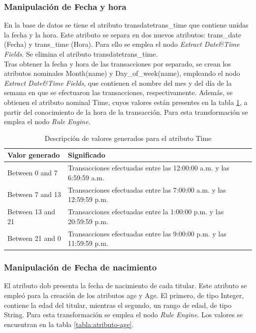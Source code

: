 \subsubsection{Manipulación de Fecha y hora}
En la base de datos se tiene el atributo \textsf{transdatetrans\_time} que contiene unidas la fecha y la hora. Este atributo se separa en dos nuevos atributos: \textsf{trans\_date} (Fecha) y \textsf{trans\_time} (Hora). Para ello se emplea el nodo \textit{Extract Date\&Time Fields}. Se elimina el atributo \textsf{transdatetrans\_time}. \\
Tras obtener la fecha y hora de las transacciones por separado, se crean los atributos nominales \textsf{Month(name)} y \textsf{Day\_of\_week(name)}, empleando el nodo \textit{Extract Date\&Time Fields}, que contienen el nombre del mes y del día de la semana en que se efectuaron las transacciones, respectivamente.
 Además, se obtienen el atributo nominal \textsf{Time}, cuyos valores están presentes en la tabla \ref{tabla:atributo-time}, a partir del conocimiento de la hora de la transacción. Para esta transformación se emplea el nodo \textit{Rule Engine}.

\begin{table} [H]
	\centering
	\begin{tabular}{p{5cm} p{7cm}}
		\toprule
		\textbf{Valor generado} & \textbf{Significado} \\
		\midrule
		Between 0 and 7 & Transacciones efectuadas entre las 12:00:00 a.m. y las 6:59:59 a.m. \\
		\addlinespace
		Between 7 and 13 & Transacciones efectuadas entre las 7:00:00 a.m. y las 12:59:59 p.m. \\
		\addlinespace
		Between 13 and 21 & Transacciones efectuadas entre la 1:00:00 p.m. y las 20:59:59 p.m. \\
		Between 21 and 0 & Transacciones efectuadas entre las 9:00:00 p.m. y las 11:59:59 p.m. \\
		\bottomrule
	\end{tabular}
	\caption{Descripción de valores generados para el atributo \textsf{Time}}
	\label{tabla:atributo-time}
\end{table}

\subsubsection{Manipulación de Fecha de nacimiento}
El atributo \textsf{dob} presenta la fecha de nacimiento de cada titular. Este atributo se empleó para la creación de los atributos \textsf{age} y \textsf{Age}. El primero, de tipo Integer, contiene la edad del titular, mientras el segundo, un rango de edad, de tipo String. Para esta transformación se emplea el nodo \textit{Rule Engine}. Los valores se encuentran en la tabla \ref{tabla:atributo-age}.

